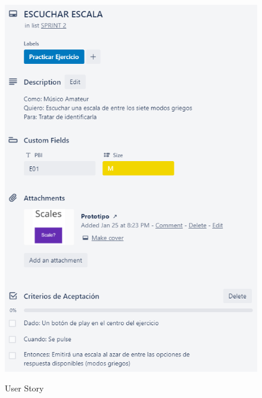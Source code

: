 \documentclass[12pt,twoside,titlepage]{report}
\begin{document}
{\begin{figure}[H]
    \centering
    \includegraphics[scale=1.3]{Scrum/User Stories/Escalas}
    \label{fig:Escalas}
    \caption{User Story}
\end{figure}

}
\end{document}
